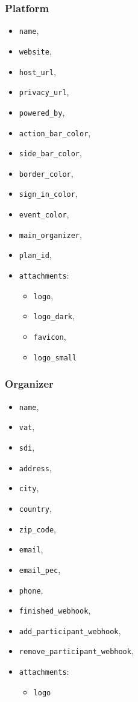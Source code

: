 \subsubsection{Platform}
\begin{itemize}
	\item \verb|name|,
	\item \verb|website|,
	\item \verb|host_url|,
	\item \verb|privacy_url|,
	\item \verb|powered_by|,
	\item \verb|action_bar_color|,
	\item \verb|side_bar_color|,
	\item \verb|border_color|,
	\item \verb|sign_in_color|,
	\item \verb|event_color|,
	\item \verb|main_organizer|,
	\item \verb|plan_id|,
	\item \verb|attachments|:
	\begin{itemize}
		\item \verb|logo|,
		\item \verb|logo_dark|,
		\item \verb|favicon|,
		\item \verb|logo_small|
	\end{itemize}
\end{itemize}

\subsubsection{Organizer}
\begin{itemize}
	\item \verb|name|,
	\item \verb|vat|,
	\item \verb|sdi|,
	\item \verb|address|,
	\item \verb|city|,
	\item \verb|country|,
	\item \verb|zip_code|,
	\item \verb|email|,
	\item \verb|email_pec|,
	\item \verb|phone|,
	\item \verb|finished_webhook|,
	\item \verb|add_participant_webhook|,
	\item \verb|remove_participant_webhook|,
	\item \verb|attachments|:
	\begin{itemize}
		\item \verb|logo|
	\end{itemize}
\end{itemize}

